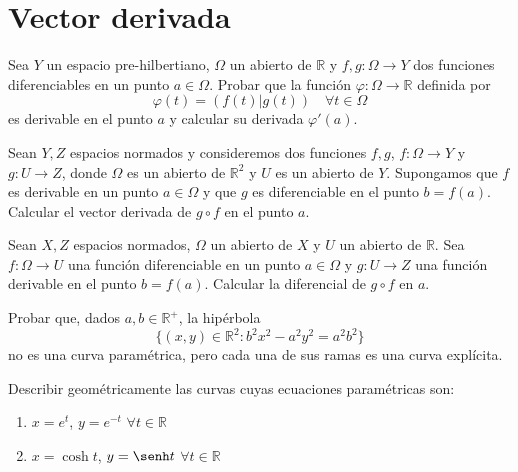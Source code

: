 \section{Vector derivada}

\begin{ejercicio}
Sea \( Y \) un espacio pre-hilbertiano, \( \Omega \) un abierto de \( \mathbb{R} \) y \( f,g : \Omega \rightarrow Y \) dos funciones diferenciables en un punto \( a \in \Omega \). Probar que la función \( \varphi : \Omega \rightarrow \mathbb{R} \) definida por
\[
\varphi(t) = \left( f(t) | g(t) \right) \quad \forall t \in \Omega
\]
es derivable en el punto \( a \) y calcular su derivada \( \varphi'(a) \).
\end{ejercicio}

\begin{ejercicio}
Sean \( Y,Z \) espacios normados y consideremos dos funciones $f,g$, \( f: \Omega \rightarrow Y \) y \( g : U \rightarrow Z \), donde \( \Omega \) es un abierto de \( \mathbb{R}^2 \) y \( U \) es un abierto de \( Y \). Supongamos que \( f \) es derivable en un punto \( a \in \Omega \) y que \( g \) es diferenciable en el punto \( b = f(a) \). Calcular el vector derivada de \( g \circ f \) en el punto \( a \).
\end{ejercicio}

\begin{ejercicio}
Sean \( X,Z \) espacios normados, \( \Omega \) un abierto de \( X \) y \( U \) un abierto de \( \mathbb{R} \). Sea \( f : \Omega \rightarrow U \) una función diferenciable en un punto \( a \in \Omega \) y \( g : U \rightarrow Z \) una función derivable en el punto \( b = f(a) \). Calcular la diferencial de \( g \circ f \) en \( a \).
\end{ejercicio}

\begin{ejercicio}
Probar que, dados \( a,b \in \mathbb{R}^+ \), la hipérbola \[ \{(x,y) \in \mathbb{R}^2 : b^2x^2 - a^2y^2 = a^2b^2\} \] no es una curva paramétrica, pero cada una de sus ramas es una curva explícita.
\end{ejercicio}

\begin{ejercicio}
Describir geométricamente las curvas cuyas ecuaciones paramétricas son:
\begin{enumerate}
    \item \( x = e^t \), \( y = e^{-t} \) \qquad \( \forall t \in \mathbb{R} \)
    \item \( x = \cosh t \), \( y = \senh t \) \qquad \( \forall t \in \mathbb{R} \)
\end{enumerate}
\end{ejercicio}
    